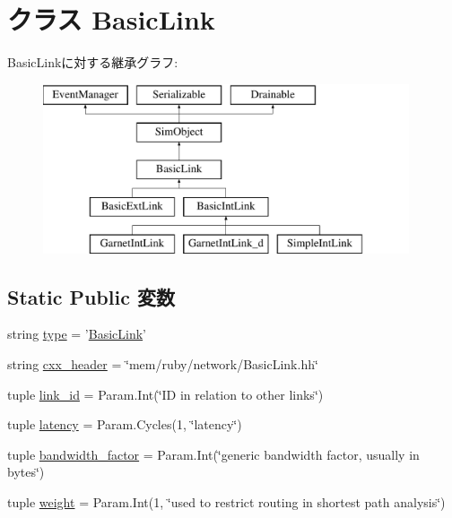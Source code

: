\hypertarget{classBasicLink_1_1BasicLink}{
\section{クラス BasicLink}
\label{classBasicLink_1_1BasicLink}
}
BasicLinkに対する継承グラフ:\begin{figure}[H]
\begin{center}
\leavevmode
\includegraphics[height=5cm]{classBasicLink_1_1BasicLink}
\end{center}
\end{figure}
\subsection*{Static Public 変数}
\begin{DoxyCompactItemize}
\item 
string \hyperlink{classBasicLink_1_1BasicLink_acce15679d830831b0bbe8ebc2a60b2ca}{type} = '\hyperlink{classBasicLink_1_1BasicLink}{BasicLink}'
\item 
string \hyperlink{classBasicLink_1_1BasicLink_a17da7064bc5c518791f0c891eff05fda}{cxx\_\-header} = \char`\"{}mem/ruby/network/BasicLink.hh\char`\"{}
\item 
tuple \hyperlink{classBasicLink_1_1BasicLink_a68ad93ab49e865b9e80829c3ee7130c7}{link\_\-id} = Param.Int(\char`\"{}ID in relation to other links\char`\"{})
\item 
tuple \hyperlink{classBasicLink_1_1BasicLink_ab6371bb71615c96debd0d27d34943fed}{latency} = Param.Cycles(1, \char`\"{}latency\char`\"{})
\item 
tuple \hyperlink{classBasicLink_1_1BasicLink_ac591437927b62e1825866e5357208d37}{bandwidth\_\-factor} = Param.Int(\char`\"{}generic bandwidth factor, usually in bytes\char`\"{})
\item 
tuple \hyperlink{classBasicLink_1_1BasicLink_a90d9613549ac0a6a4fe0bc646fc0892f}{weight} = Param.Int(1, \char`\"{}used to restrict routing in shortest path analysis\char`\"{})
\end{DoxyCompactItemize}


